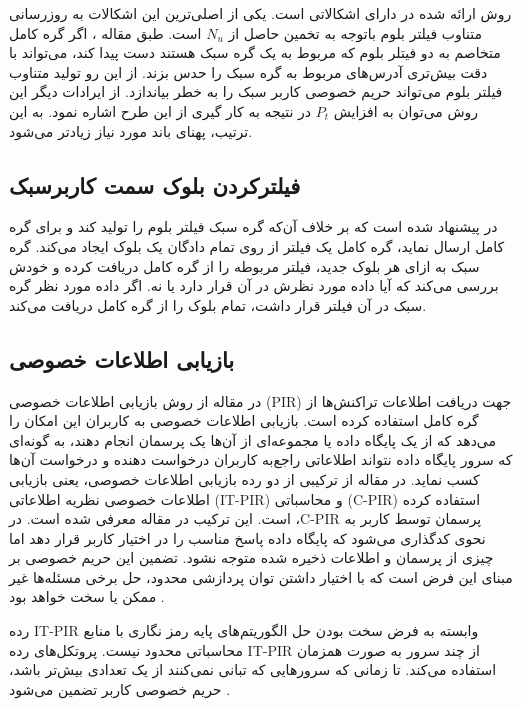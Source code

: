 روش ارائه شده در \cite{Kanemura2017} دارای اشکالاتی است. یکی از اصلی‌ترین این اشکالات به روزرسانی متناوب فیلتر بلوم باتوجه به تخمین حاصل از $N_u$  است. طبق مقاله \cite{Gervais2014}، اگر گره کامل متخاصم به دو فیتلر بلوم که مربوط به یک گره سبک هستند دست پیدا کند، می‌تواند با دقت بیش‌تری آدرس‌های مربوط به گره سبک را حدس بزند. از این رو تولید متناوب فیلتر بلوم می‌تواند حریم خصوصی کاربر سبک را به خطر بیاندازد.
از ایرادات دیگر این روش می‌توان به افزایش $P_t$ در نتیجه به کار گیری از این طرح اشاره نمود. به این ترتیب، پهنای باند مورد نیاز زیادتر می‌شود. 

\subsection{فیلترکردن بلوک سمت کاربرسبک}
\label{BIP157}
در \cite{Osuntokun2017} پیشنهاد شده است که بر خلاف آن‌که گره سبک فیلتر بلوم را تولید کند و برای گره کامل ارسال نماید، گره کامل یک فیلتر از روی تمام دادگان یک بلوک ایجاد می‌کند. گره سبک به ازای هر بلوک جدید، فیلتر مربوطه را از گره کامل دریافت کرده و خودش بررسی می‌کند که آیا داده مورد نظرش در آن قرار دارد یا نه. اگر داده مورد نظر گره سبک در آن فیلتر قرار داشت، تمام بلوک را از گره کامل دریافت می‌کند.

\subsection{بازیابی اطلاعات خصوصی}
\label{PIR}
در مقاله \cite{Qin2019} از روش بازیابی اطلاعات خصوصی (PIR) جهت دریافت اطلاعات تراکنش‌ها از گره‌ کامل استفاده کرده است. بازیابی اطلاعات خصوصی به کاربران این امکان را می‌دهد که از یک پایگاه داده یا مجموعه‌ای از آن‌ها یک پرسمان انجام دهند، به گونه‌ای که سرور پایگاه داده نتواند اطلاعاتی راجع‌به کاربران درخواست دهنده و درخواست آن‌ها کسب نماید. در مقاله \cite{Qin2019}  از ترکیبی از دو رده بازیابی اطلاعات خصوصی، یعنی بازیابی اطلاعات خصوصی نظریه اطلاعاتی (IT-PIR) و محاسباتی (C-PIR) استفاده کرده است. این ترکیب در مقاله \cite{Devet2014} معرفی شده است. در ،C-PIR پرسمان توسط کاربر به نحوی کدگذاری می‌شود که پایگاه داده پاسخ مناسب را در اختیار کاربر قرار دهد اما چیزی از پرسمان و اطلاعات ذخیره شده متوجه نشود. تضمین این حریم خصوصی بر مبنای این فرض است که با اختیار داشتن توان پردازشی محدود، حل برخی مسئله‌ها  غیر ممکن یا سخت خواهد بود \cite{Devet2014}.

رده IT-PIR وابسته به فرض سخت بودن حل الگوریتم‌های پایه رمز نگاری با منابع محاسباتی محدود نیست. پروتکل‌های رده IT-PIR از چند سرور به صورت همزمان استفاده می‌کند. تا زمانی که سرورهایی که تبانی نمی‌کنند از یک تعدادی بیش‌تر باشد، حریم خصوصی کاربر تضمین می‌شود \cite{Devet2014}. 

